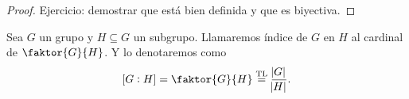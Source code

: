 \begin{proof}
    Ejercicio: demostrar que está bien definida y que es biyectiva.
\end{proof}

\begin{defi}
    Sea $G$ un grupo y $H \subseteq G$ un subgrupo. Llamaremos índice de $G$ en $H$ al cardinal de $\faktor{G}{H}$.
    Y lo denotaremos como
    \[
        \left[G : H \right] = \faktor{G}{H} \stackrel{\text{TL}}{=} \frac{\abs{G}}{\abs{H}}.
    \]
\end{defi}

